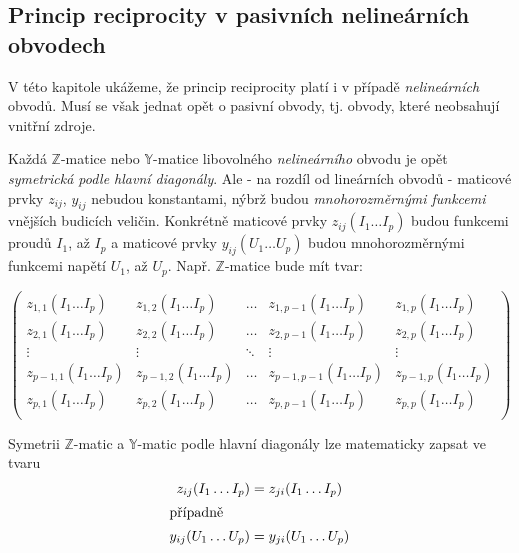     \subsection{Princip reciprocity v pasivních nelineárních 
    obvodech}\label{teo:IchapIIsecIsubIII}
      V této kapitole ukážeme, že princip reciprocity platí i v případě \emph{nelineárních} obvodů. 
      Musí se však jednat opět o pasivní obvody, tj. obvody, které neobsahují vnitřní zdroje.
      
      Každá \(\mathbb{Z}\)-matice nebo \(\mathbb{Y}\)-matice libovolného \emph{nelineárního} obvodu 
      je opět \emph{symetrická podle hlavní diagonály}. Ale - na rozdíl od lineárních obvodů - 
      maticové prvky \(z_{ij}\), \(y_{ij}\) nebudou konstantami, nýbrž budou \emph{mnohorozměrnými 
      funkcemi} vnějších budicích veličin. Konkrétně maticové prvky \(z_{ij}(I_1\ldots I_p)\) budou 
      funkcemi proudů \(I_1\), až \(I_p\) a maticové prvky \(y_{ij}(U_1\ldots U_p)\) budou 
      mnohorozměrnými funkcemi napětí \(U_1\), až \(U_p\). Např. \(\mathbb{Z}\)-matice bude mít 
      tvar:
      \begin{widetext}
        \begin{equation*}
          \left(
            \begin{array}{ccccc}
              z_{1,1}(I_1\ldots I_p)     &  z_{1,2}(I_1\ldots I_p)   & \ldots & 
              z_{1,p-1}(I_1\ldots I_p)   &  z_{1,p}(I_1\ldots I_p)                   \\
              z_{2,1}(I_1\ldots I_p)     &  z_{2,2}(I_1\ldots I_p)   & \ldots & 
              z_{2,p-1}(I_1\ldots I_p)   &  z_{2,p}(I_1\ldots I_p)                   \\
              \vdots      &  \vdots      &  \ddots     & \vdots      & \vdots        \\
              z_{p-1,1}(I_1\ldots I_p)   &  z_{p-1,2}(I_1\ldots I_p) & \ldots & 
              z_{p-1,p-1}(I_1\ldots I_p) &  z_{p-1,p}(I_1\ldots I_p)                 \\
              z_{p,1}(I_1\ldots I_p)     &  z_{p,2}(I_1\ldots I_p)   & \ldots & 
              z_{p,p-1}(I_1\ldots I_p)   &  z_{p,p}(I_1\ldots I_p)                   \\
            \end{array}
          \right)
        \end{equation*}
      \end{widetext}
      
      Symetrii \(\mathbb{Z}\)-matic a \(\mathbb{Y}\)-matic podle hlavní diagonály lze matematicky 
      zapsat ve tvaru
      \begin{subequations}
        \begin{align}\label{ES:eq_topol06}
          z_{ij}(I_1\ldots I_p) &= z_{ji}(I_1\ldots I_p) \\
          \shortintertext{případně}
          y_{ij}(U_1\ldots U_p) &= y_{ji}(U_1\ldots U_p)
        \end{align}
      \end{subequations}
      

